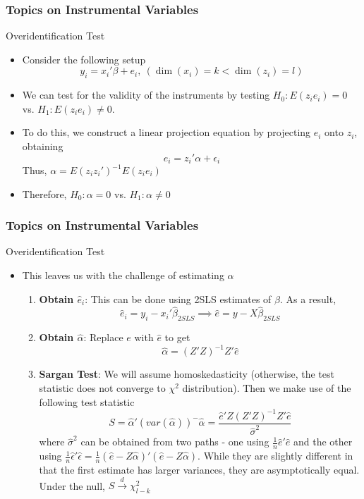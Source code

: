 \documentclass{beamer}
\begin{document}
\begin{frame}
\frametitle{Topics on Instrumental Variables}
Overidentification Test
\begin{itemize}
\item Consider the following setup
\[
y_i = x_i'\beta+e_i, \ (\dim(x_i)=k<\dim(z_i)=l) 
\]
\item We can test for the validity of the instruments by testing $H_0: E(z_ie_i)=0$ vs. $H_1: E(z_ie_i)\neq0$.
\item To do this, we construct a linear projection equation by projecting $e_i$ onto $z_i$, obtaining
\[
e_i=z_i'\alpha+\epsilon_i
\]
Thus, $\alpha=E(z_iz_i')^{-1}E(z_ie_i)$
\item Therefore,  $H_0: \alpha=0$ vs. $H_1: \alpha\neq0$
\end{itemize}
\end{frame}

\begin{frame}
\frametitle{Topics on Instrumental Variables}
Overidentification Test
\begin{itemize}
\item This leaves us with the challenge of estimating $\alpha$
\begin{enumerate}
\item \textbf{Obtain $\hat{e}_i$}: This can be done using 2SLS estimates of $\beta$. As a result, 
\[
\hat{e}_i = y_i-x_i'\hat{\beta}_{2SLS} \implies \hat{e}=y-X\hat{\beta}_{2SLS}
\]
\item \textbf{Obtain $\hat{\alpha}$}: Replace $e$ with $\hat{e}$ to get
\[
\hat{\alpha} = (Z'Z)^{-1}Z'\hat{e}
\]
\item \textbf{Sargan Test}: We will assume homoskedasticity (otherwise, the test statistic does not converge to $\chi^2$ distribution). Then we make use of the following test statistic
\[
S=\hat{\alpha}'(var(\hat{\alpha}))^{-}\hat{\alpha}=\frac{\hat{e}'Z(Z'Z)^{-1}Z'\hat{e}}{\hat{\sigma}^2}
\]
where $\hat{\sigma}^2$ can be obtained from two paths - one using $\frac{1}{n}\hat{e}'\hat{e}$ and the other using $\frac{1}{n}\hat{\epsilon}'\hat{\epsilon}=\frac{1}{n}(\hat{e}-Z\hat{\alpha})'(\hat{e}-Z\hat{\alpha})$. While they are slightly different in that the first estimate has larger variances, they are asymptotically equal. Under the null, $S\xrightarrow{d}\chi_{l-k}^2$
\end{enumerate}
\end{itemize}
\end{frame}
\end{document}
